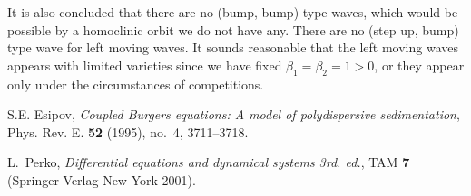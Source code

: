 \documentclass{amsart}
\theoremstyle{definition}
\numberwithin{equation}{section}
\begin{document}
It is also concluded that there are no (bump, bump) type waves, which would be possible by a homoclinic orbit we do not have any. There are no (step up, bump) type wave for left moving waves. It sounds reasonable that the left moving waves appears with limited varieties since we have fixed $\beta_1=\beta_2=1>0$, or they appear only under the circumstances of competitions.



\begin{thebibliography}{10}

S.E. Esipov, \emph{Coupled Burgers equations: A model of polydispersive sedimentation}, Phys. Rev. E. \textbf{52} (1995), no.~4, 3711--3718. 

{\sc L.~Perko}, {\it Differential equations and dynamical systems 3rd. ed.}, TAM {\bf 7} (Springer-Verlag New York 2001).
\end{thebibliography}
\end{document}
